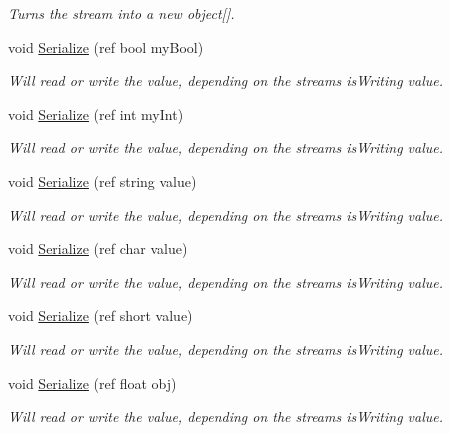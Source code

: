 \begin{DoxyCompactItemize}
\begin{DoxyCompactList}\small\item\em Turns the stream into a new object\mbox{[}\mbox{]}.\end{DoxyCompactList}\item 
void \hyperlink{class_photon_stream_a1bfb478104459081a25e0cf8208de9f4}{Serialize} (ref bool my\+Bool)
\begin{DoxyCompactList}\small\item\em Will read or write the value, depending on the stream\textquotesingle{}s is\+Writing value. \end{DoxyCompactList}\item 
void \hyperlink{class_photon_stream_ab3cf6c969d02214b001ddecc8dcd34ca}{Serialize} (ref int my\+Int)
\begin{DoxyCompactList}\small\item\em Will read or write the value, depending on the stream\textquotesingle{}s is\+Writing value. \end{DoxyCompactList}\item 
void \hyperlink{class_photon_stream_a372ce5e9fc5a92e0a5581ed2cb357724}{Serialize} (ref string value)
\begin{DoxyCompactList}\small\item\em Will read or write the value, depending on the stream\textquotesingle{}s is\+Writing value. \end{DoxyCompactList}\item 
void \hyperlink{class_photon_stream_a64fe29df11450f421046871947a54d5d}{Serialize} (ref char value)
\begin{DoxyCompactList}\small\item\em Will read or write the value, depending on the stream\textquotesingle{}s is\+Writing value. \end{DoxyCompactList}\item 
void \hyperlink{class_photon_stream_a23ad49d3b2a2395d29f6035595c33a60}{Serialize} (ref short value)
\begin{DoxyCompactList}\small\item\em Will read or write the value, depending on the stream\textquotesingle{}s is\+Writing value. \end{DoxyCompactList}\item 
void \hyperlink{class_photon_stream_a0f65bddf114f21922e307a67e9a959a1}{Serialize} (ref float obj)
\begin{DoxyCompactList}\small\item\em Will read or write the value, depending on the stream\textquotesingle{}s is\+Writing value. \end{DoxyCompactList}\item 

\end{DoxyCompactItemize}
